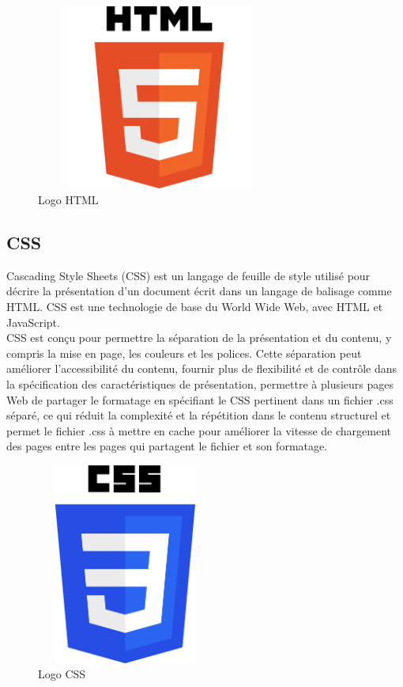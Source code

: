 \documentclass[12pt]{report}
\begin{document}
\vspace{0.6in}

\begin{figure}[h]
\centering
    \includegraphics[width = 3.2in, height = 2.4in]{../Images/Html.png}
\caption{Logo HTML}
\end{figure}

\newpage

\subsection{CSS}

Cascading Style Sheets (CSS) est un langage de feuille de style utilisé pour décrire la présentation d'un document écrit dans un langage de balisage comme HTML. CSS est une technologie de base du World Wide Web, avec HTML et JavaScript.
\\
CSS est conçu pour permettre la séparation de la présentation et du contenu, y compris la mise en page, les couleurs et les polices. Cette séparation peut améliorer l'accessibilité du contenu, fournir plus de flexibilité et de contrôle dans la spécification des caractéristiques de présentation, permettre à plusieurs pages Web de partager le formatage en spécifiant le CSS pertinent dans un fichier .css séparé, ce qui réduit la complexité et la répétition dans le contenu structurel et permet le fichier .css à mettre en cache pour améliorer la vitesse de chargement des pages entre les pages qui partagent le fichier et son formatage.

\vspace{0.22in}

\begin{figure}[h]
\centering
    \includegraphics[width = 2.3in, height = 2.6in]{../Images/CSS.png}
\caption{Logo CSS}
\end{figure}
\end{document}
